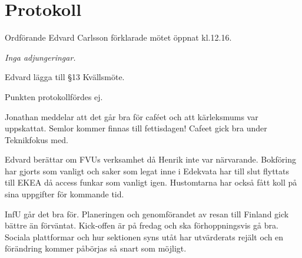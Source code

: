 \documentclass[10pt]{article}
\def\mo{Edvard Carlsson}
\begin{document}
\section*{Protokoll}
\begin{paragrafer}
Ordförande {\mo} förklarade mötet öppnat kl.12.16.

{\valavmo}

{\valavms}

{\valavj}

{\tosg}

\textit{Inga adjungeringar.}


Edvard \ypa lägga till §13 Kvällsmöte.

\Mbaby


\textit{\ingaprot}

\begin{fyllnadsval} %


\end{fyllnadsval}

\begin{paragrafer}
Punkten protokollfördes ej.

Jonathan meddelar att det går bra för caféet och att kärleksmums var uppskattat. Semlor kommer finnas till fettisdagen! Cafeet gick bra under Teknikfokus med. 

Edvard berättar om FVUs verksamhet då Henrik inte var närvarande. Bokföring har gjorts som vanligt och saker som legat inne i Edekvata har till slut flyttats till EKEA då access funkar som vanligt igen. Hustomtarna har också fått koll på sina uppgifter för kommande tid.

InfU går det bra för. Planeringen och genomförandet av resan till Finland gick bättre än förväntat. Kick-offen är på fredag och ska förhoppningsvis gå bra. Sociala plattformar och hur sektionen syns utåt har utvärderats rejält och en förändring kommer påbörjas så snart som möjligt.


\end{paragrafer}
\end{paragrafer}
\end{document}

